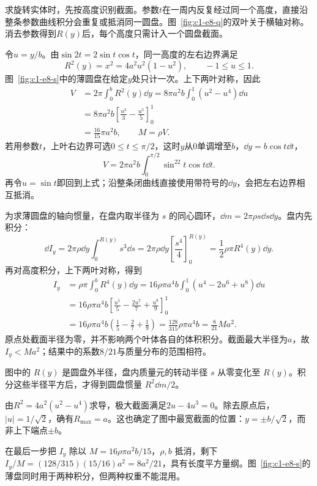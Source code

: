 \begin{solution}
求旋转实体时，先按高度识别截面。参数$t$在一周内反复经过同一个高度，直接沿整条参数曲线积分会重复或抵消同一圆盘。图~\ref{fig:c1-e8-q}的双叶关于横轴对称。消去参数得到$R(y)$后，每个高度只需计入一个圆盘截面。


令$u=y/b$。由$\sin2t=2\sin t\cos t$，同一高度的左右边界满足
\[R^2(y)=x^2=4a^2u^2(1-u^2),\qquad -1\le u\le1.
\]
图~\ref{fig:c1-e8-s}中的薄圆盘在给定$y$处只计一次。上下两叶对称，因此
\begin{align*}
V&=2\pi\int_0^b R^2(y)\dd y
=8\pi a^2b\int_0^1(u^2-u^4)\dd u\\
&=8\pi a^2b\left[\frac{u^3}{3}-\frac{u^5}{5}\right]_0^1\\
&=\boxed{\frac{16}{15}\pi a^2b},\qquad M=\rho V.
\end{align*}
若用参数$t$，上叶右边界可选$0\le t\le\pi/2$，这时$y$从$0$单调增至$b$，$\dd y=b\cos t\dd t$，
\[V=2\pi a^2b\int_0^{\pi/2}\sin^22t\cos t\dd t.
\]
再令$u=\sin t$即回到上式；沿整条闭曲线直接使用带符号的$\dd y$，会把左右边界相互抵消。

为求薄圆盘的轴向惯量，在盘内取半径为 $s$ 的同心圆环，$\dd m=2\pi\rho s\dd s\dd y$。盘内先积分：
\[
\dd I_y=2\pi\rho\dd y\int_0^{R(y)}s^3\dd s
=2\pi\rho\dd y\left[\frac{s^4}{4}\right]_0^{R(y)}
=\frac12\rho\pi R^4(y)\dd y.
\]
再对高度积分，上下两叶对称，得到
\begin{align*}
I_y&=\rho\pi\int_0^b R^4(y)\dd y
=16\rho\pi a^4b\int_0^1(u^4-2u^6+u^8)\dd u\\
&=16\rho\pi a^4b\left[\frac{u^5}{5}-\frac{2u^7}{7}+\frac{u^9}{9}\right]_0^1\\
&=16\rho\pi a^4b\left(\frac15-\frac27+\frac19\right)
=\boxed{\frac{128}{315}\rho\pi a^4b=\frac8{21}Ma^2}.
\end{align*}
原点处截面半径为零，并不影响两个叶体各自的体积积分。截面最大半径为$a$，故$I_y<Ma^2$；结果中的系数$8/21$与质量分布的范围相符。


图中的 $R(y)$ 是圆盘外半径，盘内质量元的转动半径 $s$ 从零变化至 $R(y)$。积分这些半径平方后，才得到圆盘惯量 $R^2\dd m/2$。

由$R^2=4a^2(u^2-u^4)$求导，极大截面满足$2u-4u^3=0$。除去原点后，$|u|=1/\sqrt2$，确有$R_{\max}=a$。这也确定了图中最宽截面的位置：$y=\pm b/\sqrt2$，而非上下端点$\pm b$。

在最后一步把 $I_y$ 除以 $M=16\rho\pi a^2b/15$，$\rho,b$ 抵消，剩下 $I_y/M=(128/315)(15/16)a^2=8a^2/21$，具有长度平方量纲。图~\ref{fig:c1-e8-s}的薄盘同时用于两种积分，但两种权重不能混用。


\end{solution}

